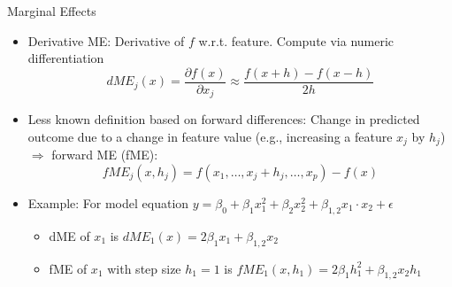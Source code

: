 \documentclass[11pt,compress,t,notes=noshow, aspectratio=169, xcolor=table]{beamer}
\begin{document}




\begin{frame}{Marginal Effects}

\begin{itemize}
\item
Derivative ME: Derivative of $f$ w.r.t. feature. Compute via numeric differentiation
$$dME_j(x) = \frac{\partial f(x)}{\partial x_j} \approx \frac{f(x + h) - f(x - h)}{2h}$$
\item Less known definition based on forward differences: Change in predicted outcome due to a change in feature value (e.g., increasing a feature $x_j$ by $h_j$) $\Rightarrow$ forward ME (fME):
\begin{equation*}
fME_j(x, h_j) = f(x_1, \dots, x_j + h_j, \dots, x_p) - f(x)
\end{equation*}
\item Example: For model equation $y = \beta_0 + \beta_{1} x_1^2 + \beta_{2} x_2^2 + \beta_{1, 2} x_1 \cdot x_2 + \epsilon$
\begin{itemize}
\item dME of $x_1$ is $dME_1(x) = 2\beta_1 x_1 +  \beta_{1, 2} x_2$
\item fME of $x_1$ with step size $h_1 = 1$ is
$fME_1(x, h_1) = 2\beta_1 h_1^2 +  \beta_{1, 2} x_2 h_1$
\end{itemize}
\end{itemize}
\end{frame}
\end{document}
